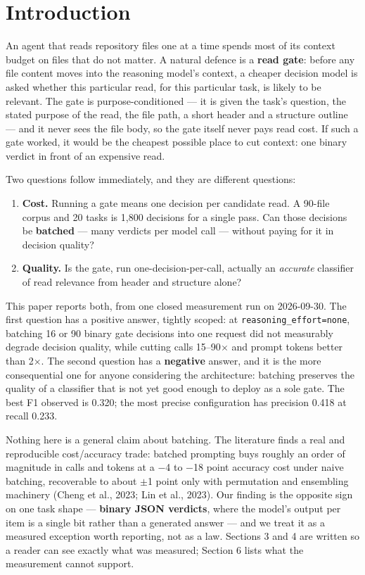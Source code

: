 \documentclass[11pt,a4paper]{article}
\begin{document}
\section{Introduction}

An agent that reads repository files one at a time spends most of its context budget on files that do not matter. A natural defence is a \textbf{read gate}: before any file content moves into the reasoning model's context, a cheaper decision model is asked whether this particular read, for this particular task, is likely to be relevant. The gate is purpose-conditioned --- it is given the task's question, the stated purpose of the read, the file path, a short header and a structure outline --- and it never sees the file body, so the gate itself never pays read cost. If such a gate worked, it would be the cheapest possible place to cut context: one binary verdict in front of an expensive read.

Two questions follow immediately, and they are different questions:

\begin{enumerate}
\item \textbf{Cost.} Running a gate means one decision per candidate read. A 90-file corpus and 20 tasks is 1,800 decisions for a single pass. Can those decisions be \textbf{batched} --- many verdicts per model call --- without paying for it in decision quality?
\item \textbf{Quality.} Is the gate, run one-decision-per-call, actually an \emph{accurate} classifier of read relevance from header and structure alone?
\end{enumerate}

This paper reports both, from one closed measurement run on 2026-09-30. The first question has a positive answer, tightly scoped: at \texttt{reasoning\_effort=none}, batching 16 or 90 binary gate decisions into one request did not measurably degrade decision quality, while cutting calls 15--90$\times$ and prompt tokens better than 2$\times$. The second question has a \textbf{negative} answer, and it is the more consequential one for anyone considering the architecture: batching preserves the quality of a classifier that is not yet good enough to deploy as a sole gate. The best F1 observed is 0.320; the most precise configuration has precision 0.418 at recall 0.233.

Nothing here is a general claim about batching. The literature finds a real and reproducible cost/accuracy trade: batched prompting buys roughly an order of magnitude in calls and tokens at a $-$4 to $-$18 point accuracy cost under naive batching, recoverable to about $\pm$1 point only with permutation and ensembling machinery (Cheng et al., 2023; Lin et al., 2023)\cite{ref3,ref6}. Our finding is the opposite sign on one task shape --- \textbf{binary JSON verdicts}, where the model's output per item is a single bit rather than a generated answer --- and we treat it as a measured exception worth reporting, not as a law. Sections 3 and 4 are written so a reader can see exactly what was measured; Section 6 lists what the measurement cannot support.
\end{document}
